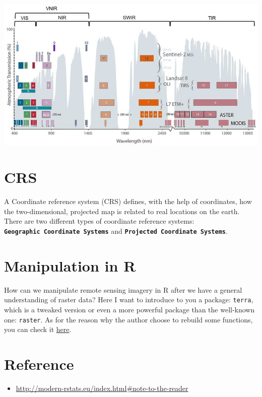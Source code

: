 \documentclass[
]{book}
\providecommand{\tightlist}{%
  \setlength{\itemsep}{0pt}\setlength{\parskip}{0pt}}
\begin{document}
\includegraphics{images/Spectral-resolution.png}\\

\hypertarget{crs}{%
\section{CRS}\label{crs}}

A Coordinate reference system (CRS) defines, with the help of coordinates, how the two-dimensional, projected map is related to real locations on the earth. There are two different types of coordinate reference systems: \textbf{\texttt{Geographic\ Coordinate\ Systems}} and \textbf{\texttt{Projected\ Coordinate\ Systems}}.

\hypertarget{manipulation-in-r}{%
\section{Manipulation in R}\label{manipulation-in-r}}

How can we manipulate remote sensing imagery in R after we have a general understanding of raster data? Here I want to introduce to you a package: \texttt{terra}, which is a tweaked version or even a more powerful package than the well-known one: \texttt{raster}. As for the reason why the author choose to rebuild some functions, you can check it \href{http://www.wvview.org/os_sa/15_Raster_Analysis_terra.html}{here}.

\hypertarget{reference}{%
\section{Reference}\label{reference}}

\begin{itemize}
\tightlist
\item
  \url{http://modern-rstats.eu/index.html\#note-to-the-reader}
\end{itemize}
\end{document}
